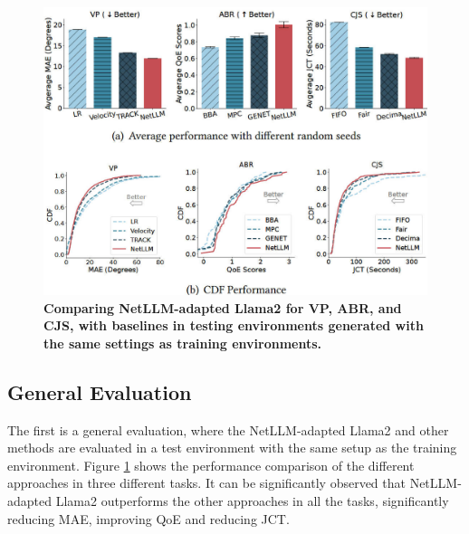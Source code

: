 \documentclass[twocolumn]{article}
\begin{document}
\begin{figure}[t]
  \centering
  \includegraphics[width=1\linewidth]{img/figure5.jpg}
  \caption{\textbf{Comparing NetLLM-adapted Llama2 for VP, ABR, and CJS, with baselines in testing environments generated with the same settings as training environments.}}
  \label{fig:5}
\end{figure}

\subsection{General Evaluation}
The first is a general evaluation, where the NetLLM-adapted Llama2 and other methods are evaluated in a test environment with the same setup as the training environment. Figure \ref{fig:5} shows the performance comparison of the different approaches in three different tasks. It can be significantly observed that NetLLM-adapted Llama2 outperforms the other approaches in all the tasks, significantly reducing MAE, improving QoE and reducing JCT.
\end{document}
